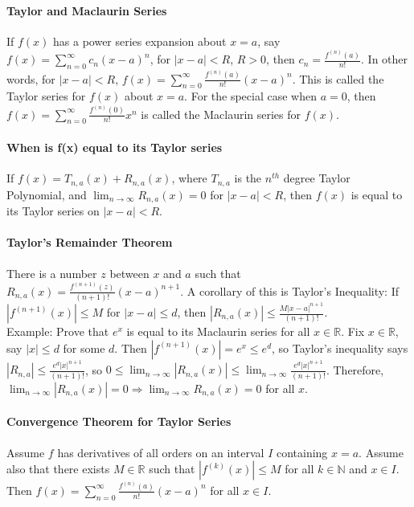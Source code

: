 \documentclass[10pt,letter]{article}
\begin{document}
\paragraph{Taylor and Maclaurin Series} If $f(x)$ has a power series expansion about $x=a$, say $f(x)=\sum_{n=0}^\infty c_n(x-a)^n$, for $|x-a|<R$, $R>0$, then $c_n=\frac{f^{(n)}(a)}{n!}$. In other words, for $|x-a|<R$, $f(x)=\sum_{n=0}^\infty \frac{f^{(n)}(a)}{n!}(x-a)^n$. This is called the Taylor series for $f(x)$ about $x=a$. For the special case when $a=0$, then $f(x)=\sum_{n=0}^\infty\frac{f^{(n)}(0)}{n!}x^n$ is called the Maclaurin series for $f(x)$. 

\paragraph{When is f(x) equal to its Taylor series} If $f(x)=T_{n,a}(x)+R_{n,a}(x)$, where $T_{n,a}$ is the $n^{th}$ degree Taylor Polynomial, and $\lim_{n\rightarrow\infty}R_{n,a}(x)=0$ for $|x-a|<R$, then $f(x)$ is equal to its Taylor series on $|x-a|<R$. 

\paragraph{Taylor's Remainder Theorem} There is a number $z$ between $x$ and $a$ such that $R_{n,a}(x)=\frac{f^{(n+1)}(z)}{(n+1)!}(x-a)^{n+1}$. A corollary of this is Taylor's Inequality: If $|f^{(n+1)}(x)|\leq M$ for $|x-a|\leq d$, then $|R_{n,a}(x)|\leq\frac{M|x-a|^{n+1}}{(n+1)!}$. \\ 
Example: Prove that $e^x$ is equal to its Maclaurin series for all $x\in\mathbb{R}$. Fix $x\in\mathbb{R}$, say $|x|\leq d$ for some $d$. Then $|f^{(n+1)}(x)|=e^x\leq e^d$, so Taylor's inequality says $|R_{n,a}|\leq\frac{e^d|x|^{n+1}}{(n+1)!}$, so $0\leq\lim_{n\rightarrow\infty}|R_{n,a}(x)|\leq\lim_{n\rightarrow\infty}\frac{e^d|x|^{n+1}}{(n+1)!}$. Therefore, $\lim_{n\rightarrow\infty}|R_{n,a}(x)|=0\Rightarrow\lim_{n\rightarrow\infty}R_{n,a}(x)=0$ for all $x$. 

\paragraph{Convergence Theorem for Taylor Series} Assume $f$ has derivatives of all orders on an interval $I$ containing $x=a$. Assume also that there exists $M\in\mathbb{R}$ such that $|f^{(k)}(x)|\leq M$ for all $k\in\mathbb{N}$ and $x\in I$. Then $f(x)=\sum_{n=0}^\infty\frac{f^{(n)}(a)}{n!}(x-a)^n$ for all $x\in I$. 
\end{document}
